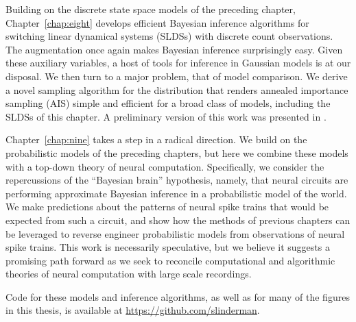 Building on the discrete state space models of the preceding chapter,
Chapter~\ref{chap:eight} develops efficient Bayesian inference
algorithms for switching linear dynamical systems (SLDSs) with
discrete count observations. The \polyagamma augmentation once again
makes Bayesian inference surprisingly easy. Given these auxiliary
variables, a host of tools for inference in Gaussian models is at
our disposal.  We then turn to a major problem, that of model comparison.
We derive a novel sampling algorithm for the \polyagamma distribution
that renders annealed importance sampling (AIS) simple and efficient
for a broad class of models, including the SLDSs of this chapter.
A preliminary version of this work was presented in \citet{linderman2016cosyne}.

Chapter~\ref{chap:nine} takes a step in a radical direction. We build
on the probabilistic models of the preceding chapters, but here we
combine these models with a top-down theory of neural
computation. Specifically, we consider the repercussions of the
``Bayesian brain'' hypothesis, namely, that neural circuits are
performing approximate Bayesian inference in a probabilistic model of
the world. We make predictions about the patterns of neural spike
trains that would be expected from such a circuit, and show how the
methods of previous chapters can be leveraged to reverse engineer
probabilistic models from observations of neural spike trains. This
work is necessarily speculative, but we believe it suggests a
promising path forward as we seek to reconcile computational and
algorithmic theories of neural computation with large scale
recordings.

Code for these models and inference algorithms, as well as for many of the
figures in this thesis, is available at \url{https://github.com/slinderman}.
